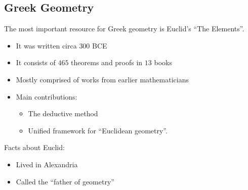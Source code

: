 \documentclass[class=article, crop=false]{standalone}
\begin{document}
  \subsection{Greek Geometry}
  The most important resource for Greek geometry is Euclid's ``The Elements''.
  \begin{itemize}
    \item It was written circa $300$ BCE
    \item It consists of $465$ theorems and proofs in $13$ books
    \item Mostly comprised of works from earlier mathematicians
    \item Main contributions:
    \begin{itemize}
      \item The deductive method
      \item Unified framework for ``Euclidean geometry''.
    \end{itemize}
  \end{itemize}
  Facts about Euclid:
  \begin{itemize}
    \item Lived in Alexandria
    \item Called the ``father of geometry''
  \end{itemize}
\end{document}
